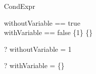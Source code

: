 \begin{zsection}
  \SECTION CondExpr
\end{zsection}

\begin{zed}
  withoutVariable == \IF true  \\
  withVariable == \IF false \THEN \{1\} \ELSE \{\}
\end{zed}

\begin{zed} \vdash? withoutVariable = 1 \end{zed}
\begin{zed} \vdash? withVariable = \{\} \end{zed}
